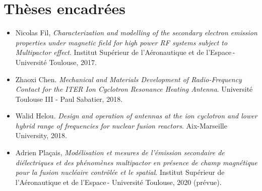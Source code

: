 \documentclass[
fontsize=10pt, %
twoside=true, %
numbers=noenddot, %
]{kaobook}
\begin{document}
	\section*{Thèses encadrées}
	\begin{itemize}
	\item Nicolas Fil, \textit{Characterization and modelling of the secondary electron emission properties under magnetic field for high power RF systems subject to Multipactor effect}. Institut Supérieur de l'Aéronautique et de l'Espace - Université Toulouse, 2017. 
	
	\item Zhaoxi Chen. \textit{Mechanical and Materials Development of Radio-Frequency Contact for the ITER Ion Cyclotron Resonance Heating Antenna}. Université Toulouse III - Paul Sabatier, 2018.
	
	\item Walid Helou. \textit{Design and operation of antennas at the ion cyclotron and lower hybrid range of frequencies for nuclear fusion reactors}. Aix-Marseille University, 2018.

		\item Adrien Plaçais, \textit{Modélisation et mesures de l'émission secondaire de diélectriques et des phénomènes multipactor en présence de champ magnétique pour la fusion nucléaire contrôlée et le spatial}. Institut Supérieur de l'Aéronautique et de l'Espace - Université Toulouse, 2020 (prévue).
	
	\end{itemize}
\end{document}
